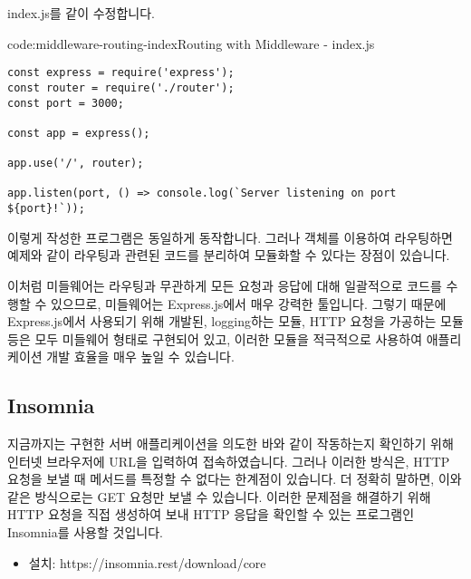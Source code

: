 index.js를 \와 같이 수정합니다.

\begin{codeenv}{code:middleware-routing-index}{Routing with Middleware - index.js}\begin{verbatim}
const express = require('express');
const router = require('./router');
const port = 3000;

const app = express();

app.use('/', router);

app.listen(port, () => console.log(`Server listening on port ${port}!`));
\end{verbatim}
\end{codeenv}

이렇게 작성한 프로그램은 \와 동일하게 동작합니다. 그러나  객체를 이용하여 라우팅하면 예제와 같이 라우팅과 관련된 코드를 분리하여 모듈화할 수 있다는 장점이 있습니다.

이처럼 미들웨어는 라우팅과 무관하게 모든 요청과 응답에 대해 일괄적으로 코드를 수행할 수 있으므로, 미들웨어는 Express.js에서 매우 강력한 툴입니다. 그렇기 때문에 Express.js에서 사용되기 위해 개발된, logging하는 모듈, HTTP 요청을 가공하는 모듈 등은 모두 미들웨어 형태로 구현되어 있고, 이러한 모듈을 적극적으로 사용하여 애플리케이션 개발 효율을 매우 높일 수 있습니다.

\subsection*{Insomnia}
지금까지는 구현한 서버 애플리케이션을 의도한 바와 같이 작동하는지 확인하기 위해 인터넷 브라우저에 URL을 입력하여 접속하였습니다. 그러나 이러한 방식은, HTTP 요청을 보낼 때 메서드를 특정할 수 없다는 한계점이 있습니다. 더 정확히 말하면, 이와 같은 방식으로는 GET 요청만 보낼 수 있습니다. 이러한 문제점을 해결하기 위해 HTTP 요청을 직접 생성하여 보내 HTTP 응답을 확인할 수 있는 프로그램인 Insomnia를 사용할 것입니다.

\begin{itemize}
    \item 설치: https://insomnia.rest/download/core
\end{itemize}
